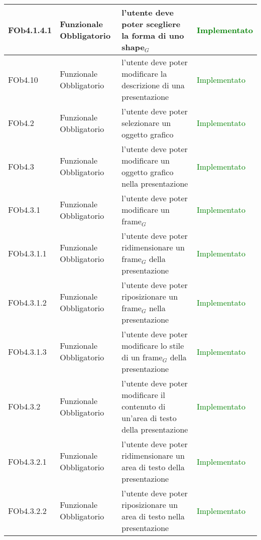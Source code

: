 \begin{longtable}{|l|p{2.5cm}|p{5cm}|p{3.5cm}|}
\hline
FOb4.1.4.1 & Funzionale \linebreak Obbligatorio & l'utente deve poter scegliere la forma di uno shape$_G$ & \textcolor{green}{Implementato}  \\
\hline
FOb4.10 & Funzionale \linebreak Obbligatorio & l'utente deve poter modificare la descrizione di una presentazione & \textcolor{green}{Implementato}  \\
\hline
FOb4.2 & Funzionale \linebreak Obbligatorio & l'utente deve poter selezionare un oggetto grafico & \textcolor{green}{Implementato} \\
\hline
FOb4.3 & Funzionale \linebreak Obbligatorio & l'utente deve poter modificare un oggetto grafico nella presentazione & \textcolor{green}{Implementato}  \\
\hline
FOb4.3.1 & Funzionale \linebreak Obbligatorio & l'utente deve poter modificare un frame$_G$ & \textcolor{green}{Implementato}  \\
\hline
FOb4.3.1.1 & Funzionale \linebreak Obbligatorio & l'utente deve poter ridimensionare un frame$_G$ della presentazione & \textcolor{green}{Implementato}  \\
\hline
FOb4.3.1.2 & Funzionale \linebreak Obbligatorio & l'utente deve poter riposizionare un frame$_G$ nella presentazione & \textcolor{green}{Implementato}  \\
\hline
FOb4.3.1.3 & Funzionale \linebreak Obbligatorio & l'utente deve poter modificare lo stile di un frame$_G$ della presentazione & \textcolor{green}{Implementato}  \\
\hline
FOb4.3.2 & Funzionale \linebreak Obbligatorio & l'utente deve poter modificare il contenuto di un'area di testo della presentazione & \textcolor{green}{Implementato}  \\
\hline
FOb4.3.2.1 & Funzionale \linebreak Obbligatorio & l'utente deve poter ridimensionare un area di testo della presentazione & \textcolor{green}{Implementato}  \\
\hline
FOb4.3.2.2 & Funzionale \linebreak Obbligatorio & l'utente deve poter riposizionare un area di testo nella presentazione & \textcolor{green}{Implementato}  \\

\end{longtable}
